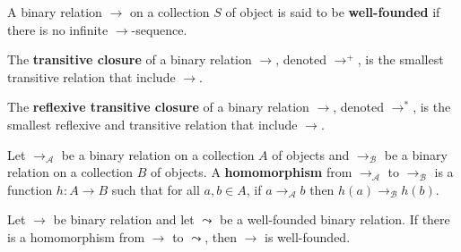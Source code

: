 \begin{definition}
    \label{def:binary_relation:well_founded}
    A binary relation $\to$ on a collection $S$ of object is said to be \textbf{well-founded} if there is no infinite $\to$-sequence. 
\end{definition}

\begin{definition}
    \label{def:binary_relation:transitive_closure}
    The \textbf{transitive closure} of a binary relation $\to$, denoted $\to^+$, is the smallest transitive relation that include \( \to \).
  \end{definition}
  
  \begin{definition}
    \label{def:binary_relation:reflexive_transitive_closure}
    The \textbf{reflexive transitive closure} of a binary relation $\to$, denoted $\to^*$, is the smallest reflexive and transitive relation that include \( \to \).
  \end{definition}

  \begin{definition}
    \label{def:binary_relation:homomorphism}
    Let $\to_\mathcal{A}$ be a binary relation on a collection $A$ of objects and $\to_\mathcal{B}$ be a binary relation on a collection $B$ of objects. A \textbf{homomorphism} from $\to_\mathcal{A}$ to $\to_\mathcal{B}$ is a function \( h: A \to B \) such that for all \( a, b \in A \), if \( a \to_\mathcal{A} b \) then \( h(a) \to_\mathcal{B} h(b) \).
  \end{definition}
  
\begin{proposition}
  \label{prop:binary_relation:proving_well_foundedness}
  Let \(\to\) be binary relation and let $\leadsto$ be a well-founded binary relation. If there is a homomorphism from \(\to\) to \(\leadsto\), then \(\to\) is well-founded.
\end{proposition}